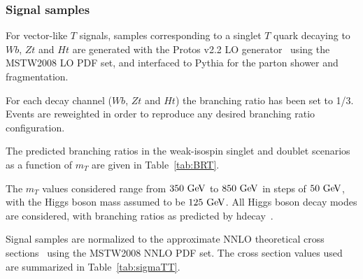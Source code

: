 \subsubsection{Signal samples}\label{subsec:MCsignal}


For vector-like $T$ signals, samples corresponding to a singlet $T$ quark 
decaying to $Wb$, $Zt$ and $Ht$ are generated with the {\sc Protos} v2.2 
LO generator~\cite{jaas,protos} 
using the  {\sc MSTW2008} LO PDF set, and interfaced to {\sc Pythia} for 
the parton shower and fragmentation. 

For each decay channel ($Wb$, $Zt$ and $Ht$) the branching ratio has been 
set to 1/3. Events are reweighted
in order to reproduce any desired branching ratio configuration. 

The predicted branching ratios in the weak-isospin singlet and doublet scenarios as 
a function of $m_{T}$ are given in Table~\ref{tab:BRT}.

The $m_{T}$ values considered range from $350\gev$ to $850\gev$ in steps of $50\gev$, 
with the Higgs boson mass assumed 
to be $125\gev$. All Higgs boson decay modes are considered, 
with branching ratios as predicted by {\sc hdecay}~\cite{hdecay}.

Signal samples are normalized to the approximate NNLO theoretical cross sections~\cite{ttbarxs} using the {\sc MSTW2008} NNLO PDF set.
The cross section values used are summarized in Table~\ref{tab:sigmaTT}.



